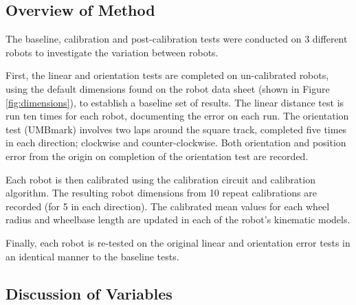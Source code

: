 \documentclass[conference]{IEEEtran}
\begin{document}

\subsection{Overview of Method}

The baseline, calibration and post-calibration tests were conducted on 3 different robots to investigate the variation between robots. 

First, the linear and orientation tests are completed on un-calibrated robots, using the default dimensions found on the robot data sheet \cite{pololu_guide} (shown in Figure \ref{fig:dimensions}), to establish a baseline set of results. 
The linear distance test is run ten times for each robot, documenting the error on each run. 
The orientation test (UMBmark) involves two laps around the square track, completed five times in each direction; clockwise and counter-clockwise.
Both orientation and position error from the origin on completion of the orientation test are recorded.

Each robot is then calibrated using the calibration circuit and calibration algorithm. 
The resulting robot dimensions from 10 repeat calibrations are recorded (for 5 in each direction).
The calibrated mean values for each wheel radius and wheelbase length are updated in each of the robot's kinematic models. 

Finally, each robot is re-tested on the original linear and orientation error tests in an identical manner to the baseline tests. 

\subsection{Discussion of Variables}
\end{document}
